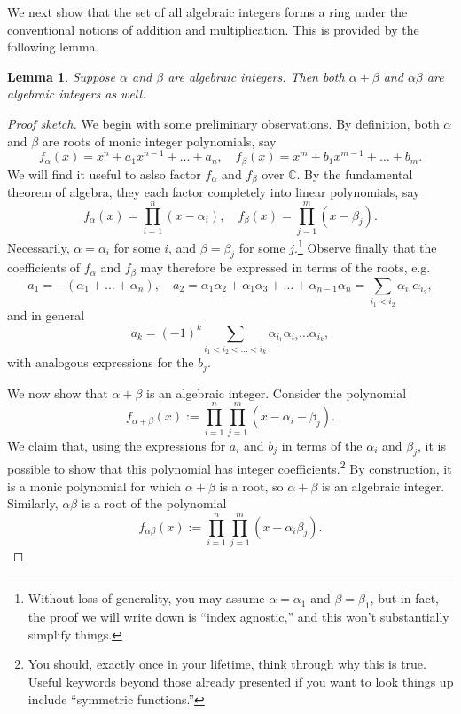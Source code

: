 \documentclass[12pt]{amsart}
\newtheorem{lemma}[theorem]{Lemma}
\theoremstyle{definition} \newtheorem*{notation}{Notation}
\theoremstyle{remark} \newtheorem*{remark}{Remark}
\theoremstyle{remark} \newtheorem*{example}{Example}
\theoremstyle{definition} \newtheorem*{definition}{Definition}
\numberwithin{equation}{section}
\numberwithin{theorem}{section}
\begin{document}
	We next show that the set of all algebraic integers forms a ring under the conventional notions of addition and multiplication.  This is provided by the following lemma.
	
	\begin{lemma}\label{lem:integers-closed}
		Suppose $\alpha$ and $\beta$ are algebraic integers.  Then both $\alpha+\beta$ and $\alpha \beta$ are algebraic integers as well.
	\end{lemma}
	\begin{proof}[Proof sketch]
		We begin with some preliminary observations.  By definition, both $\alpha$ and $\beta$ are roots of monic integer polynomials, say
			\[
				f_\alpha(x) = x^n + a_1 x^{n-1} + \dots + a_n, \quad f_\beta(x) = x^m + b_1 x^{m-1} + \dots + b_m.
			\]
		We will find it useful to aslso factor $f_\alpha$ and $f_\beta$ over $\mathbb{C}$.  By the fundamental theorem of algebra, they each factor completely into linear polynomials, say
			\[
				f_\alpha(x) = \prod_{i=1}^n (x-\alpha_i), \quad f_\beta(x) = \prod_{j=1}^m (x-\beta_j).
			\]
		Necessarily, $\alpha = \alpha_i$ for some $i$, and $\beta = \beta_j$ for some $j$.\footnote{Without loss of generality, you may assume $\alpha = \alpha_1$ and $\beta = \beta_1$, but in fact, the proof we will write down is ``index agnostic,'' and this won't substantially simplify things.}  Observe finally that the coefficients of $f_\alpha$ and $f_\beta$ may therefore be expressed in terms of the roots, e.g.
			\[
				a_1 = -(\alpha_1 + \dots + \alpha_n), \quad a_2 = \alpha_1\alpha_2 + \alpha_1\alpha_3 + \dots + \alpha_{n-1} \alpha_n = \sum_{i_1 < i_2} \alpha_{i_1}\alpha_{i_2},
			\]
		and in general
			\[
				a_k = (-1)^k \sum_{i_1 < i_2 < \dots < i_k} \alpha_{i_1}\alpha_{i_2} \dots \alpha_{i_k},
			\]
		with analogous expressions for the $b_j$.
			
		We now show that $\alpha+\beta$ is an algebraic integer.  Consider the polynomial
			\[
				f_{\alpha+\beta}(x) := \prod_{i=1}^n \prod_{j=1}^m (x-\alpha_i-\beta_j).
			\]
		We claim that, using the expressions for $a_i$ and $b_j$ in terms of the $\alpha_i$ and $\beta_j$, it is possible to show that this polynomial has integer coefficients.\footnote{You should, exactly once in your lifetime, think through why this is true.  Useful keywords beyond those already presented if you want to look things up include ``symmetric functions.''}  By construction, it is a monic polynomial for which $\alpha+\beta$ is a root, so $\alpha+\beta$ is an algebraic integer.  Similarly, $\alpha\beta$ is a root of the polynomial
			\[
				f_{\alpha\beta}(x) := \prod_{i=1}^n \prod_{j=1}^m (x-\alpha_i\beta_j).
			\]
	\end{proof}
	
\end{document}
